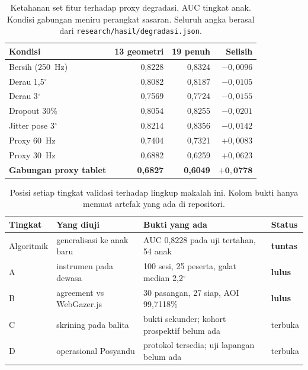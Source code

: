 \documentclass{article}
\begin{document}
\begin{table}[h]
\caption{Ketahanan set fitur terhadap proxy degradasi, AUC tingkat anak. Kondisi gabungan
meniru perangkat sasaran. Seluruh angka berasal dari \texttt{research/hasil/degradasi.json}.}
\label{tab:degradasi}
\begin{center}
\small
\begin{tabular}{lrrr}
\toprule
\textbf{Kondisi} & \textbf{13 geometri} & \textbf{19 penuh} & \textbf{Selisih} \\
\midrule
Bersih (250~Hz)                       & 0,8228 & 0,8324 & $-0,0096$ \\
Derau 1,5$^\circ$                     & 0,8082 & 0,8187 & $-0,0105$ \\
Derau 3$^\circ$                       & 0,7569 & 0,7724 & $-0,0155$ \\
Dropout 30\%                          & 0,8054 & 0,8255 & $-0,0201$ \\
Jitter pose 3$^\circ$                 & 0,8214 & 0,8356 & $-0,0142$ \\
Proxy 60~Hz                           & 0,7404 & 0,7321 & $+0,0083$ \\
Proxy 30~Hz                           & 0,6882 & 0,6259 & $+0,0623$ \\
\textbf{Gabungan proxy tablet}        & \textbf{0,6827} & \textbf{0,6049} & $\mathbf{+0,0778}$ \\
\bottomrule
\end{tabular}
\end{center}
\end{table}

\begin{table}[h]
\caption{Posisi setiap tingkat validasi terhadap lingkup makalah ini. Kolom bukti hanya
memuat artefak yang ada di repositori.}
\label{tab:gate}
\begin{center}
\small
\begin{tabular}{llll}
\toprule
\textbf{Tingkat} & \textbf{Yang diuji} & \textbf{Bukti yang ada} & \textbf{Status} \\
\midrule
Algoritmik & generalisasi ke anak baru & AUC 0,8228 pada uji tertahan, 54 anak & \textbf{tuntas} \\
A & instrumen pada dewasa & 100 sesi, 25 peserta, galat median 2,2$^\circ$ & \textbf{lulus} \\
B & agreement vs WebGazer.js & 30 pasangan, 27 siap, AOI 99,7118\% & \textbf{lulus} \\
C & skrining pada balita & bukti sekunder; kohort prospektif belum ada & terbuka \\
D & operasional Posyandu & protokol tersedia; uji lapangan belum ada & terbuka \\
\bottomrule
\end{tabular}
\end{center}
\end{table}
\end{document}
